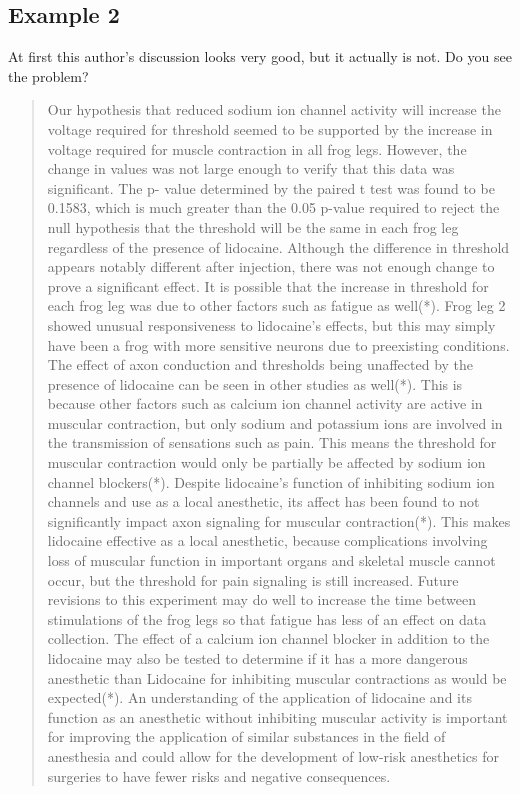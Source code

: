 \documentclass[
]{book}
\begin{document}
\hypertarget{example-2-8}{%
\subsection{Example 2}\label{example-2-8}}

At first this author's discussion looks very good, but it actually is not. Do you see the problem?

\begin{quote}
Our hypothesis that reduced sodium ion channel activity will increase the voltage required for threshold seemed to be supported by the increase in voltage required for muscle contraction in all frog legs. However, the change in values was not large enough to verify that this data was significant. The p- value determined by the paired t test was found to be 0.1583, which is much greater than the 0.05 p-value required to reject the null hypothesis that the threshold will be the same in each frog leg regardless of the presence of lidocaine. Although the difference in threshold appears notably different after injection, there was not enough change to prove a significant effect. It is possible that the increase in threshold for each frog leg was due to other factors such as fatigue as well(*). Frog leg 2 showed unusual responsiveness to lidocaine's effects, but this may simply have been a frog with more sensitive neurons due to preexisting conditions. The effect of axon conduction and thresholds being unaffected by the presence of lidocaine can be seen in other studies as well(*). This is because other factors such as calcium ion channel activity are active in muscular contraction, but only sodium and potassium ions are involved in the transmission of sensations such as pain. This means the threshold for muscular contraction would only be partially be affected by sodium ion channel blockers(*). Despite lidocaine's function of inhibiting sodium ion channels and use as a local anesthetic, its affect has been found to not significantly impact axon signaling for muscular contraction(*). This makes lidocaine effective as a local anesthetic, because complications involving loss of muscular function in important organs and skeletal muscle cannot occur, but the threshold for pain signaling is still increased. Future revisions to this experiment may do well to increase the time between stimulations of the frog legs so that fatigue has less of an effect on data collection. The effect of a calcium ion channel blocker in addition to the lidocaine may also be tested to determine if it has a more dangerous anesthetic than Lidocaine for inhibiting muscular contractions as would be expected(*). An understanding of the application of lidocaine and its function as an anesthetic without inhibiting muscular activity is important for improving the application of similar substances in the field of anesthesia and could allow for the development of low-risk anesthetics for surgeries to have fewer risks and negative consequences.
\end{quote}
\end{document}
